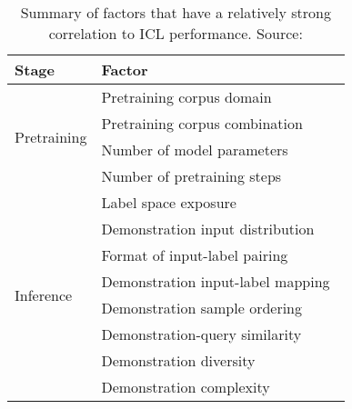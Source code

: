 \begin{table}[h!]
	\centering
	\small
	\begin{tabularx}{0.8\textwidth}{lX}
		\toprule
		\textbf{Stage} & \textbf{Factor}                                                                               \\
		\midrule
		\multirow{4}{*}{Pretraining}
		               & Pretraining corpus domain~\cite{shin2022effect}                                               \\
		               & Pretraining corpus combination~\cite{shin2022effect}                                          \\
		               & Number of model parameters~\cite{wei2022emergent, brown2020language}                          \\
		               & Number of pretraining steps~\cite{wei2022emergent}                                            \\
		\midrule
		\multirow{8}{*}{Inference}
		               & Label space exposure~\cite{min2022rethinking}                                                 \\
		               & Demonstration input distribution~\cite{min2022rethinking}                                     \\
		               & Format of input-label pairing~\cite{min2022rethinking,an2023how}                              \\
		               & Demonstration input-label mapping~\cite{min2022rethinking, yoo2022groundtruth, wei2023symbol} \\
		               & Demonstration sample ordering~\cite{lu2022fantastically}                                      \\
		               & Demonstration-query similarity~\cite{lu2022fantastically}                                     \\
		               & Demonstration diversity~\cite{an2023how}                                                      \\
		               & Demonstration complexity~\cite{an2023how}                                                     \\
		\bottomrule
	\end{tabularx}
	\caption{Summary of factors that have a relatively strong correlation to ICL performance. Source: \textcite{dong2023survey}}
	\label{tab:icl-factors}
\end{table}

